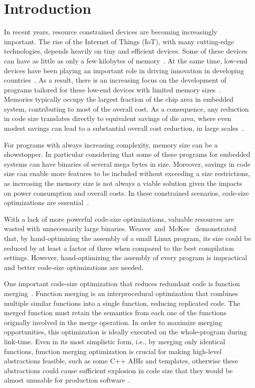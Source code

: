 \section{Introduction}
\label{sec:introduction}


In recent years, resource constrained devices are becoming increasingly important.
The rise of the Internet of Things (IoT), with many cutting-edge technologies,
depends heavily on tiny and efficient devices.
Some of these devices can have as little as only a few kilobytes of
memory~\cite{yelamarthi17,plaza18}.
At the same time, low-end devices have been playing an important role in driving
innovation in developing countries~\cite{hart02,etzo10}.
As a result, there is an increasing focus on the development of programs
tailored for these low-end devices with limited memory sizes~\cite{androidGo,hahm16}.
Memories typically occupy the largest fraction of the chip area in embedded
system, contributing to most of the overall cost.
As a consequence, any reduction in code size translates directly to equivalent
savings of die area, where even modest savings can lead to a substantial overall
cost reduction, in large scales~\cite{edler10}.

For programs with always increasing complexity, memory size can be a showstopper.
In particular considering that some of these programs for embedded systems can
have binaries of several mega bytes in size.
Moreover, savings in code size can enable more features to be included without
exceeding a size restrictions, as increasing the memory size is not always a
viable solution given the impacts on power consumption and overall costs.
In these constrained scenarios, code-size optimizations are essential~\cite{schultz03,varma04,sehgal12,kwan12,keoh14,auler17}.

With a lack of more powerful code-size optimizations, valuable resources are
wasted with unnecessarily large binaries.
Weaver~and~McKee~\cite{weaver09} demonstrated that, by hand-optimizing the
assembly of a small Linux program, its size could be reduced by at least a factor
of three when compared to the best compilation settings.
However, hand-optimizing the assembly of every program is impractical and better
code-size optimizations are needed.

One important code-size optimization that reduces redundant code is function
merging~\cite{tallam10,edler14}.
Function merging is an interprocedural optimization that combines multiple
similar functions into a single function, reducing replicated code.
The merged function must retain the semantics from each one of the functions
orignally involved in the merge operation.
In order to maximize merging opportunities, this optimization is ideally
executed on the whole-program during link-time.
Even in its most simplistic form, i.e., by merging only identical functions,
function merging optimization is crucial for making high-level abstractions
feasible, such as some C++ ABIs and templates, otherwise these abstractions
could cause sufficient explosion in code size that they would be almost
unusable for production software~\cite{tallam10,kwan12}.

